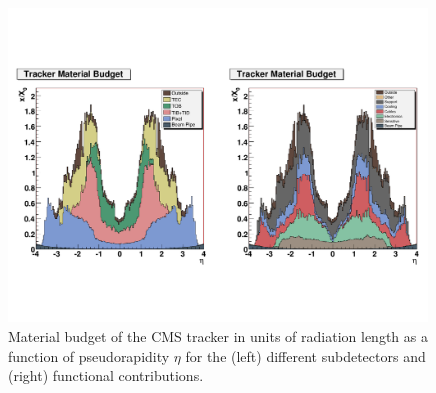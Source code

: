 \begin{figure}
 \centering
\includegraphics[width=0.99\textwidth]{CMS_DetectorFigures/TrackerMaterialBudget.pdf}
 \caption{Material budget of the CMS tracker in units of radiation
   length as a function of pseudorapidity $\eta$ for the (left)
   different subdetectors and (right) functional contributions.\label{fig:materialBudget}}
\end{figure}
